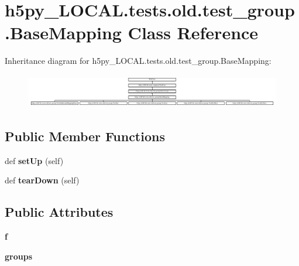 \hypertarget{classh5py__LOCAL_1_1tests_1_1old_1_1test__group_1_1BaseMapping}{}\section{h5py\+\_\+\+L\+O\+C\+A\+L.\+tests.\+old.\+test\+\_\+group.\+Base\+Mapping Class Reference}
\label{classh5py__LOCAL_1_1tests_1_1old_1_1test__group_1_1BaseMapping}
Inheritance diagram for h5py\+\_\+\+L\+O\+C\+A\+L.\+tests.\+old.\+test\+\_\+group.\+Base\+Mapping\+:\begin{figure}[H]
\begin{center}
\leavevmode
\includegraphics[height=1.485411cm]{classh5py__LOCAL_1_1tests_1_1old_1_1test__group_1_1BaseMapping}
\end{center}
\end{figure}
\subsection*{Public Member Functions}
\begin{DoxyCompactItemize}
\item 
\mbox{\label{classh5py__LOCAL_1_1tests_1_1old_1_1test__group_1_1BaseMapping_af5fe0fd210440a850bf5f74cbeb85741}} 
def {\bfseries set\+Up} (self)
\item 
\mbox{\label{classh5py__LOCAL_1_1tests_1_1old_1_1test__group_1_1BaseMapping_a5d8737389091a98201a1a6f4d37b2917}} 
def {\bfseries tear\+Down} (self)
\end{DoxyCompactItemize}
\subsection*{Public Attributes}
\begin{DoxyCompactItemize}
\item 
\mbox{\label{classh5py__LOCAL_1_1tests_1_1old_1_1test__group_1_1BaseMapping_aaa0c68537902555e626cd877ce981cd6}} 
{\bfseries f}
\item 
\mbox{\label{classh5py__LOCAL_1_1tests_1_1old_1_1test__group_1_1BaseMapping_ac88abf8a1079569b0f7939a70618a2af}} 
{\bfseries groups}
\end{DoxyCompactItemize}


